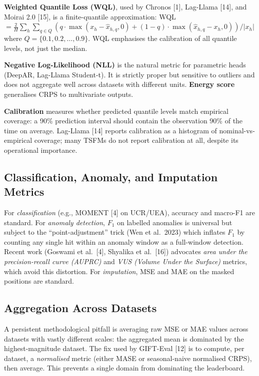 \textbf{Weighted Quantile Loss (WQL)}, used by Chronos {[}1{]}, Lag-Llama {[}14{]}, and Moirai 2.0 {[}15{]}, is a finite-quantile approximation: WQL \(= \frac{2}{H} \sum_h \sum_{q \in Q} (q \cdot \max(x_h - \hat{x}_{h,q}, 0) + (1-q)\cdot \max(\hat{x}_{h,q} - x_h, 0)) / |x_h|\) where \(Q = \{0.1, 0.2, \ldots, 0.9\}\). WQL emphasises the calibration of all quantile levels, not just the median.

\textbf{Negative Log-Likelihood (NLL)} is the natural metric for parametric heads (DeepAR, Lag-Llama Student-t). It is strictly proper but sensitive to outliers and does not aggregate well across datasets with different units. \textbf{Energy score} generalises CRPS to multivariate outputs.

\textbf{Calibration} measures whether predicted quantile levels match empirical coverage: a 90\% prediction interval should contain the observation 90\% of the time on average. Lag-Llama {[}14{]} reports calibration as a histogram of nominal-vs-empirical coverage; many TSFMs do not report calibration at all, despite its operational importance.

\subsection{Classification, Anomaly, and Imputation Metrics}\label{classification-anomaly-and-imputation-metrics}

For \emph{classification} (e.g., MOMENT {[}4{]} on UCR/UEA), accuracy and macro-F1 are standard. For \emph{anomaly detection}, \(F_1\) on labelled anomalies is universal but subject to the ``point-adjustment'' trick (Wen et al.~2023) which inflates \(F_1\) by counting any single hit within an anomaly window as a full-window detection. Recent work (Goswami et al.~{[}4{]}, Shyalika et al.~{[}16{]}) advocates \emph{area under the precision-recall curve (AUPRC)} and \emph{VUS (Volume Under the Surface)} metrics, which avoid this distortion. For \emph{imputation}, MSE and MAE on the masked positions are standard.

\subsection{Aggregation Across Datasets}\label{aggregation-across-datasets}

A persistent methodological pitfall is averaging raw MSE or MAE values across datasets with vastly different scales: the aggregated mean is dominated by the highest-magnitude dataset. The fix used by GIFT-Eval {[}12{]} is to compute, per dataset, a \emph{normalised} metric (either MASE or seasonal-naive normalised CRPS), then average. This prevents a single domain from dominating the leaderboard.


